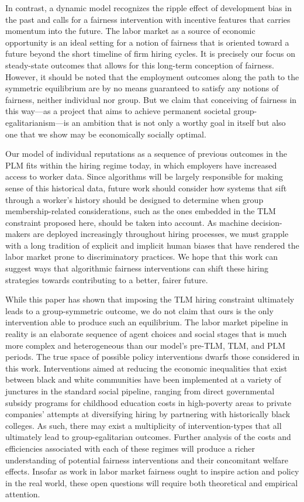 \documentclass[sigconf]{acmart}
\theoremstyle{definition}
\begin{document}
In contrast, a dynamic model recognizes the ripple effect of development bias in the past and calls for a fairness intervention with incentive features that carries momentum into the future. The labor market as a source of economic opportunity is an ideal setting for a notion of fairness that is oriented toward a future beyond the short timeline of firm hiring cycles. It is precisely our focus on steady-state outcomes that allows for this long-term conception of fairness. However, it should be noted that the employment outcomes along the path to the symmetric equilibrium are by no means guaranteed to satisfy any notions of fairness, neither individual nor group. But we claim that conceiving of fairness in this way---as a project that aims to achieve permanent societal group-egalitarianism---is an ambition that is not only a worthy goal in itself but also one that we show may be economically socially optimal. 

Our model of individual reputations as a sequence of previous outcomes in the PLM fits within the hiring regime today, in which employers have increased access to worker data. Since algorithms will be largely responsible for making sense of this historical data, future work should consider how systems that sift through a worker's history should be designed to determine when group membership-related considerations, such as the ones embedded in the TLM constraint proposed here, should be taken into account. As machine decision-makers are deployed increasingly throughout hiring processes, we must grapple with a long tradition of explicit and implicit human biases that have rendered the labor market prone to discriminatory practices. We hope that this work can suggest ways that algorithmic fairness interventions can shift these hiring strategies towards contributing to a better, fairer future. 

While this paper has shown that imposing the TLM hiring constraint ultimately leads to a group-symmetric outcome, we do not claim that ours is the only intervention able to produce such an equilibrium. The labor market pipeline in reality is an elaborate sequence of agent choices and social stages that is much more complex and heterogeneous than our model's pre-TLM, TLM, and PLM periods. The true space of possible policy interventions dwarfs those considered in this work. Interventions aimed at reducing the economic inequalities that exist between black and white communities have been implemented at a variety of junctures in the standard social pipeline, ranging from direct governmental subsidy programs for childhood education costs in high-poverty areas to private companies' attempts at diversifying hiring by partnering with historically black colleges. As such, there may exist a multiplicity of intervention-types that all ultimately lead to group-egalitarian outcomes. Further analysis of the costs and efficiencies associated with each of these regimes will produce a richer understanding of potential fairness interventions and their concomitant welfare effects. Insofar as work in labor market fairness ought to inspire action and policy in the real world, these open questions will require both theoretical and empirical attention.
\end{document}
